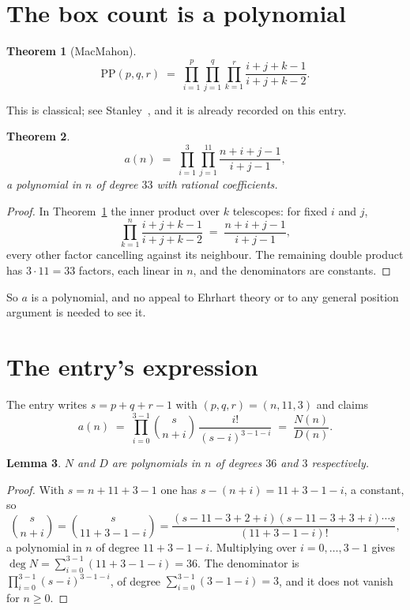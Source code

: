 \documentclass[11pt,a4paper]{article}
\theoremstyle{plain}
\newtheorem{theorem}{Theorem}
\newtheorem{lemma}[theorem]{Lemma}
\theoremstyle{definition}
\begin{document}
\section{The box count is a polynomial}

\begin{theorem}[MacMahon]\label{thm:mm}
\[
\mathrm{PP}(p,q,r)\;=\;\prod_{i=1}^{p}\prod_{j=1}^{q}\prod_{k=1}^{r}
\frac{i+j+k-1}{i+j+k-2} .
\]
\end{theorem}

This is classical; see Stanley~\cite{stanley}, and it is already recorded on this entry.

\begin{theorem}\label{thm:poly}
\[
a(n)\;=\;\prod_{i=1}^{3}\prod_{j=1}^{11}\frac{n+i+j-1}{i+j-1},
\]
a polynomial in $n$ of degree $33$ with rational coefficients.
\end{theorem}

\begin{proof}
In Theorem~\ref{thm:mm} the inner product over $k$ telescopes: for fixed $i$ and $j$,
\[
\prod_{k=1}^{n}\frac{i+j+k-1}{i+j+k-2}\;=\;\frac{n+i+j-1}{i+j-1} ,
\]
every other factor cancelling against its neighbour. The remaining double product has
$3\cdot11=33$ factors, each linear in $n$, and the denominators are constants.
\end{proof}

So $a$ is a polynomial, and no appeal to Ehrhart theory or to any general position argument is
needed to see it.

\section{The entry's expression}

The entry writes $s=p+q+r-1$ with $(p,q,r)=(n,11,3)$ and claims
\[
a(n)\;=\;\prod_{i=0}^{3-1}\binom{s}{n+i}\,\frac{i!}{(s-i)^{3-1-i}}\;=\;
\frac{N(n)}{D(n)} .
\]

\begin{lemma}\label{lem:deg}
$N$ and $D$ are polynomials in $n$ of degrees $36$ and $3$ respectively.
\end{lemma}

\begin{proof}
With $s=n+11+3-1$ one has $s-(n+i)=11+3-1-i$, a constant, so
\[
\binom{s}{n+i}=\binom{s}{11+3-1-i}
=\frac{(s-11-3+2+i)(s-11-3+3+i)\cdots s}{(11+3-1-i)!},
\]
a polynomial in $n$ of degree $11+3-1-i$. Multiplying over $i=0,\dots,3-1$ gives
$\deg N=\sum_{i=0}^{3-1}(11+3-1-i)=36$. The denominator is
$\prod_{i=0}^{3-1}(s-i)^{3-1-i}$, of degree
$\sum_{i=0}^{3-1}(3-1-i)=3$, and it does not vanish for $n\ge0$.
\end{proof}
\end{document}
